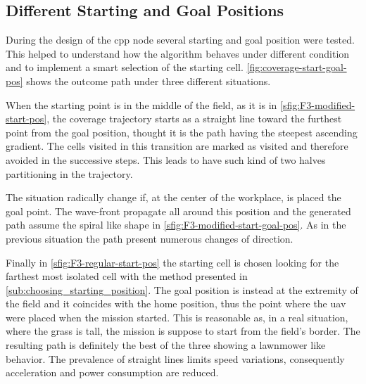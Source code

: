 \subsection{Different Starting and Goal Positions} %
\label{sub:different_starting_and_goal_positions}
During the design of {}the \acrshort{cpp} node several starting and goal position were tested. This helped to understand how the algorithm behaves under different condition and to implement a smart selection of the starting cell. \autoref{fig:coverage-start-goal-pos} shows the outcome path under three different situations.\par
When the starting point is in the middle of the field, as it is in \autoref{sfig:F3-modified-start-pos}, the coverage trajectory starts as a straight line toward the furthest point from the goal position, thought it is the path having the steepest ascending gradient. The cells visited in this transition are marked as visited and therefore avoided in the successive steps. This leads to have such kind of two halves partitioning in the trajectory.\par
The situation radically change if, at the center of the workplace, is placed the goal point. The wave-front propagate all around this position and the generated path assume the spiral like shape in \autoref{sfig:F3-modified-start-goal-pos}. As in the previous situation the path present numerous changes of direction.\par
Finally in \autoref{sfig:F3-regular-start-pos} the starting cell is chosen looking for the farthest most isolated cell with the method presented in \autoref{sub:choosing_starting_position}. The goal position is instead at the extremity of the field and it coincides with the home position, thus the point where the \acrshort{uav} were placed when the mission started. This is reasonable as, in a real situation, where the grass is tall, the mission is suppose to start from the field's border. The resulting path is definitely the best of the three showing a lawnmower like behavior. The prevalence of straight lines limits speed variations, consequently acceleration and power consumption are reduced.
